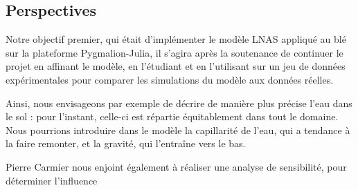 \subsection{Perspectives}

Notre objectif premier, qui était d'implémenter le modèle LNAS appliqué au blé sur la plateforme Pygmalion-Julia, il s'agira après la soutenance de continuer le projet en affinant le modèle, en l'étudiant et en l'utilisant sur un jeu de données expérimentales pour comparer les simulations du modèle aux données réelles.

Ainsi, nous envisageons par exemple de décrire de manière plus précise l'eau dans le sol : pour l'instant, celle-ci est répartie équitablement dans tout le domaine. Nous pourrions introduire dans le modèle la capillarité de l'eau, qui a tendance à la faire remonter, et la gravité, qui l'entraîne vers le bas.

Pierre Carmier nous enjoint également à réaliser une analyse de sensibilité, pour déterminer l'influence